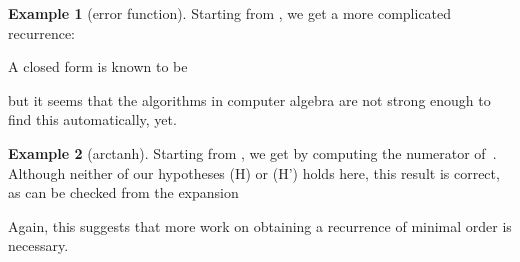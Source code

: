 \documentclass{amsart}
\theoremstyle{definition}
\newtheorem{example}{Example}
\begin{document}
\begin{example}[error function] Starting from , we get a more complicated recurrence:
	
A closed form is known to be

but it seems that the algorithms in computer algebra are not strong enough to find this automatically, yet.
\end{example}

\begin{example}[arctanh] Starting from , we get 
by computing the numerator of~. Although neither of our hypotheses (H) or (H') holds here, this result is correct, as can be checked from the expansion

Again, this suggests that more work on obtaining a recurrence of minimal order is necessary.
\end{example}
\end{document}
